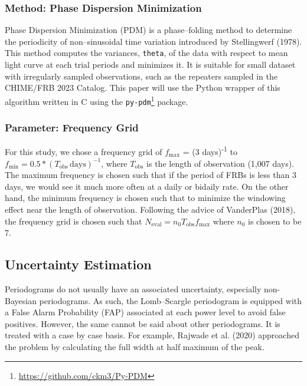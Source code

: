 \documentclass[
  rmp,
  amsmath,
  amssymb,
  preprint]{revtex4-2}
\begin{document}
\hypertarget{method-phase-dispersion-minimization}{%
\subsubsection{Method: Phase Dispersion
Minimization}\label{method-phase-dispersion-minimization}}

Phase Dispersion Minimization (PDM) is a phase--folding method to
determine the periodicity of non--sinusoidal time variation introduced
by Stellingwerf (1978). This method computes the variances,
\texttt{theta}, of the data with respect to mean light curve at each
trial periods and minimizes it. It is suitable for small dataset with
irregularly sampled observations, such as the repeaters sampled in the
CHIME/FRB 2023 Catalog. This paper will use the Python wrapper of this
algorithm written in C using the \texttt{py-pdm}\footnote{\url{https://github.com/ckm3/Py-PDM}}
package.

\hypertarget{parameter-frequency-grid}{%
\subsubsection{Parameter: Frequency
Grid}\label{parameter-frequency-grid}}

For this study, we chose a frequency grid of \(f_\text{max}\) = (3
days)\textsuperscript{-1} to
\(f_\text{min} = 0.5 * ( T_\text{obs}\, \text{days})^{-1}\), where
\(T_\text{obs}\) is the length of observation (1,007 days). The maximum
frequency is chosen such that if the period of FRBs is less than 3 days,
we would see it much more often at a daily or bidaily rate. On the other
hand, the minimum frequency is chosen such that to minimize the
windowing effect near the length of observation. Following the advice of
VanderPlas (2018), the frequency grid is chosen such that
\(N_\text{eval}=n_0T_\text{obs}f_\text{max}\) where \(n_0\) is chosen to
be 7.

\hypertarget{uncertainty-estimation}{%
\subsection{Uncertainty Estimation}\label{uncertainty-estimation}}

Periodograms do not usually have an associated uncertainty, especially
non-Bayesian periodograms. As such, the Lomb--Scargle periodogram is
equipped with a False Alarm Probability (FAP) associated at each power
level to avoid false positives. However, the same cannot be said about
other periodograms. It is treated with a case by case basis. For
example, Rajwade et al. (2020) approached the problem by calculating the
full width at half maximum of the peak.
\end{document}
